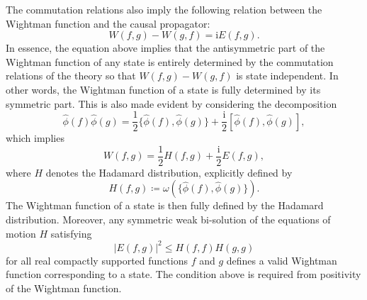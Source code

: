 \documentclass[letterpaper,12pt,titlepage,oneside,final]{book}
\newcommand{\ii}{\mathrm{i}}
\begin{document}
The commutation relations also imply the following relation between the Wightman function and the causal propagator:
\begin{equation}
    W(f,g) - W(g,f) = \ii E(f,g).
\end{equation}
In essence, the equation above implies that the antisymmetric part of the Wightman function of any state is entirely determined by the commutation relations of the theory so that $W(f,g)-W(g,f)$ is state independent. In other words, the Wightman function of a state is fully determined by its symmetric part. This is also made evident by considering the decomposition
\begin{equation}
    \hat{\phi}(f)\hat{\phi}(g) = \frac{1}{2}\{\hat{\phi}(f),\hat{\phi}(g)\} + \frac{\ii}{2}[\hat{\phi}(f),\hat{\phi}(g)],
\end{equation}
which implies
\begin{equation}\label{eq:WHE}
    W(f,g) = \frac{1}{2}H(f,g) + \frac{\ii}{2}E(f,g),
\end{equation}
where $H$ denotes the Hadamard distribution, explicitly defined by
\begin{equation}
    H(f,g) \coloneqq \omega(\{\hat{\phi}(f),\hat{\phi}(g)\}).
\end{equation}
The Wightman function of a state is then fully defined by the Hadamard distribution. Moreover, any symmetric weak bi-solution of the equations of motion $H$ satisfying
\begin{equation}
    |E(f,g)|^2\leq H(f,f)H(g,g)
\end{equation}
for all real compactly supported functions $f$ and $g$ defines a valid Wightman function corresponding to a state. The condition above is required from positivity of the Wightman function.
\end{document}
